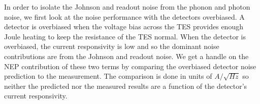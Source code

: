 
In order to isolate the Johnson and readout noise from the phonon and photon noise, we first look at the noise performance with the detectors overbiased. 
A detector is overbiased when the voltage bias across the \ac{TES} provides enough Joule heating to keep the resistance of the \ac{TES} normal. 
When the detector is overbiased, the current responsivity is low 
and so the dominant noise contributions are from the Johnson and readout noise. 
We get a handle on the \ac{NEP} contribution of these two terms by comparing the overbiased detector noise prediction to the measurement. 
The comparison is done in units of $A/\sqrt{Hz}$ so neither the predicted nor the measured results are a function of the detector's current responsivity. 

